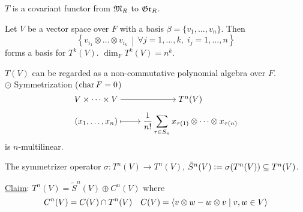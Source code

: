 \begin{exercise}
  $T$ is a covariant functor from $\mathfrak{M}_R$ to $\mathfrak{Gr}_R$.
\end{exercise}

\begin{prop}
  Let $V$ be a vector space over $F$ with a basis $\beta = \{
  v_1, \dots, v_n \}$. Then
  \[
    \left\{
      v_{i_1} \otimes \dots \otimes v_{i_k} \,\middle|\,
      \forall j = 1, \dots, k,\; i_j = 1, \dots, n
    \right\}
  \]
  forms a basis for $T^k(V)$. $\dim_F T^k(V) = n^k$.
\end{prop}

$T(V)$ can be regarded as a non-commutative polynomial algebra over $F$.
\\[.5em]
$\odot$ Symmetrization ($\operatorname{char} F = 0$)
\[
  \begin{tikzcd}[cramped, row sep=tiny]
    V \times \dots \times V \arrow[r] & T^n(V) \\
    (x_1, \dots, x_n) \arrow[r, mapsto]
    & \displaystyle \frac{1}{n!}\sum_{\tau \in S_n}
    x_{\tau(1)}\otimes \dots \otimes x_{\tau(n)}
  \end{tikzcd}
\]
is $n$-multilinear.

The symmetrizer operator $\sigma: T^n(V) \to T^n(V)$,
$\tilde{S}^n(V) \vcentcolon= \sigma(T^n(V)) \subseteq T^n(V)$.

\underline{Claim}:
$T^n(V) = \tilde{S}^n(V) \oplus C^n(V)$ where
\[ C^n(V) = C(V) \cap T^n(V) \quad
C(V) = \langle v\otimes w - w\otimes v \mid v, w\in V\rangle \]
